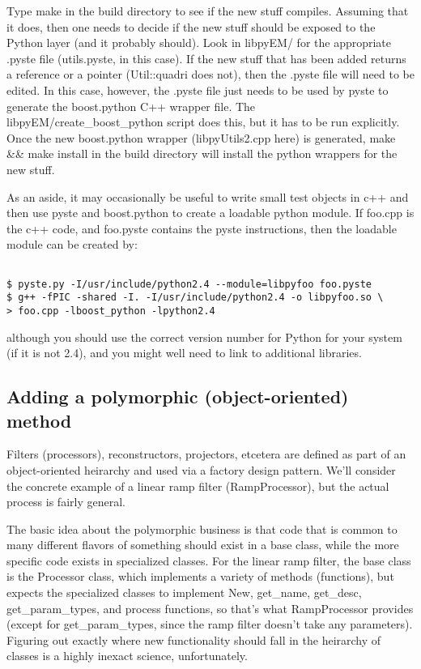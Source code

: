 Type make in the build directory to see if the new stuff compiles. Assuming that it does, then one needs to decide if the new stuff should be exposed to the Python layer (and it probably should). Look in libpyEM/ for the appropriate .pyste file (utils.pyste, in this case). If the new stuff that has been added returns a reference or a pointer (Util::quadri does not), then the .pyste file will need to be edited. In this case, however, the .pyste file just needs to be used by pyste to generate the boost.python C++ wrapper file. The libpyEM/create\_boost\_python script does this, but it has to be run explicitly. Once the new boost.python wrapper (libpyUtils2.cpp here) is generated, make \&\& make install in the build directory will install the python wrappers for the new stuff.


 As an aside, it may occasionally be useful to write small test objects in c++ and then use pyste and boost.python to create a loadable python module. If foo.cpp is the c++ code, and foo.pyste contains the pyste instructions, then the loadable module can be created by:
\begin{verbatim}

$ pyste.py -I/usr/include/python2.4 --module=libpyfoo foo.pyste
$ g++ -fPIC -shared -I. -I/usr/include/python2.4 -o libpyfoo.so \
> foo.cpp -lboost_python -lpython2.4

\end{verbatim}


 although you should use the correct version number for Python for your system (if it is not 2.4), and you might well need to link to additional libraries.
\subsection*{Adding a polymorphic (object-oriented) method}


 Filters (processors), reconstructors, projectors, etcetera are defined as part of an object-oriented heirarchy and used via a factory design pattern. We'll consider the concrete example of a linear ramp filter (RampProcessor), but the actual process is fairly general.


 The basic idea about the polymorphic business is that code that is common to many different flavors of something should exist in a base class, while the more specific code exists in specialized classes. For the linear ramp filter, the base class is the Processor class, which implements a variety of methods (functions), but expects the specialized classes to implement New, get\_name, get\_desc, get\_param\_types, and process functions, so that's what RampProcessor provides (except for get\_param\_types, since the ramp filter doesn't take any parameters). Figuring out exactly where new functionality should fall in the heirarchy of classes is a highly inexact science, unfortunately.


